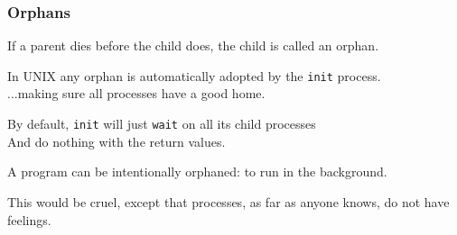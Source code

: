 \begin{frame}
\frametitle{Orphans}

If a parent dies before the child does, the child is called an \alert{orphan}. 

In UNIX any orphan is automatically adopted by the \texttt{init} process.\\
\quad ...making sure all processes have a good home. 

By default, \texttt{init} will just \texttt{wait} on all its child processes\\
\quad And do nothing with the return values.

A program can be intentionally orphaned: to run in the background.


This would be cruel, except that processes, as far as anyone knows, do not have feelings.


\end{frame}




